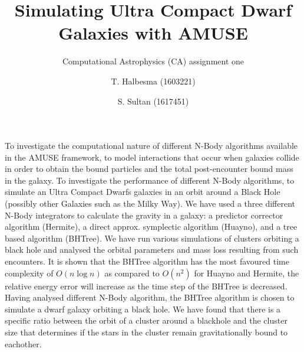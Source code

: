 \documentclass{aa}
\begin{document}
 


   \title{Simulating Ultra Compact Dwarf Galaxies with AMUSE}

   \subtitle{Computational Astrophysics (CA) assignment one}

   \author{T. Halbesma (1603221)
          \and
          S. Sultan (1617451)
          }



 
  \abstract
   {To investigate the computational nature of different N-Body algorithms
   available in the AMUSE framework, to model interactions that occur 
   when galaxies collide in order to obtain the bound particles and the total
   post-encounter bound mass in the galaxy.}
   {To investigate the performance of different 
   N-Body algorithms, to simulate an Ultra Compact Dwarfs galaxies in an orbit around
   a Black Hole (possibly other Galaxies such as the Milky Way).}
   {We have used a three different N-Body integrators to calculate the gravity in a galaxy:
   a predictor corrector algorithm (Hermite), a direct approx. symplectic algorithm (Huayno),
   and a tree based algorithm (BHTree). We have run various simulations of clusters orbiting 
   a black hole and analysed the orbital parameters and mass loss resulting from such encounters.}
   {It is shown that the BHTree algorithm has the most favoured time complexity
   of $O(n \log n)$ as compared to $O(n^2)$ for Huayno and Hermite, the
   relative energy error will increase as the time step of the BHTree is decreased.
   Having analysed different N-Body algorithm, the BHTree algorithm 
   is chosen to simulate a dwarf galaxy orbiting a black hole. We have found that there
   is a specific ratio between the orbit of a cluster around a blackhole and the cluster
   size that determines if the stars in the cluster remain gravitationally bound to eachother.}
   {}
\end{document}
